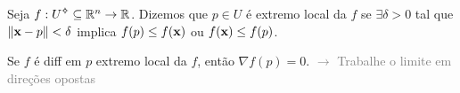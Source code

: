 \begin{definition}
    Seja \(f:U\ab\subseteq \R^n\to \R\). Dizemos que \(p \in U\) é extremo local da \(f\) se \(\exists \delta >0\) tal que \(\|\textbf{x}-p\|<\delta\) implica \(f(p) \leq f(\textbf{x}) \) ou \(f(\textbf{x}) \leq f(p)\). 
\end{definition}
\begin{exercise}
    Se \(f\) é diff em \(p\) extremo local da \(f\), então \(\nabla f (p) = 0\). \textcolor{gray}{\(\rightarrow\) Trabalhe o limite em direções opostas}
\end{exercise}

\Ef